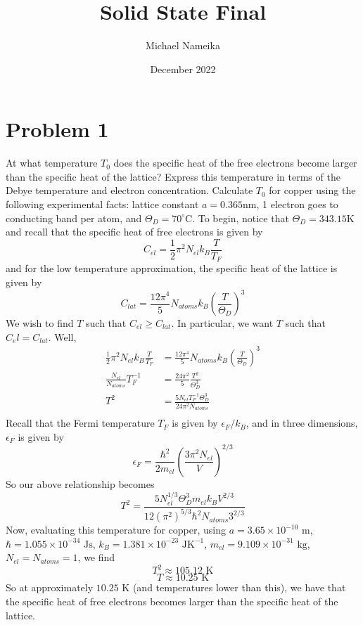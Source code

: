 \documentclass{article}
\title{Solid State Final}
\author{Michael Nameika}
\date{December 2022}
\begin{document}
\maketitle

\section*{Problem 1}
At what temperature $T_0$ does the specific heat of the free electrons become larger than the specific heat of the lattice? Express this temperature in terms of the Debye temperature and electron concentration. Calculate $T_0$ for copper using the following experimental facts: lattice constant $a = 0.365\text{nm}$, 1 electron goes to conducting band per atom, and $\Theta_D = 70^{\circ} \text{C}$.
\newline\newline
To begin, notice that $\Theta_D = 343.15 \text{K}$ and recall that the specific heat of free electrons is given by
\[C_{el} = \frac{1}{2}\pi^2N_{el}k_B\frac{T}{T_F}\]
and for the low temperature approximation, the specific heat of the lattice is given by
\[C_{lat} = \frac{12\pi^4}{5}N_{atoms}k_B\left(\frac{T}{\Theta_D}\right)^3\]
We wish to find $T$ such that $C_{el} \geq C_{lat}$. In particular, we want $T$ such that $C_el = C_{lat}$. Well,
\begin{align*}
    \frac{1}{2}\pi^2N_{el}k_B\frac{T}{T_F} &= \frac{12\pi^4}{5}N_{atoms}k_B\left(\frac{T}{\Theta_D}\right)^3 \\
    \frac{N_{el}}{N_{atoms}}T_F^{-1} &= \frac{24\pi^2}{5}\frac{T^2}{\Theta_D^3} \\
    T^2 &= \frac{5N_{el}T_F^{-1}\Theta_D^3}{24\pi^2N_{atoms}} \\
\end{align*}
Recall that the Fermi temperature $T_F$ is given by $\epsilon_F/k_B$, and in three dimensions, $\epsilon_F$ is given by
\[\epsilon_F = \frac{\hbar^2}{2m_{el}}\left(\frac{3\pi^2N_{el}}{V}\right)^{2/3}\]
So our above relationship becomes
\[T^2 = \frac{5N_{el}^{1/3}\Theta_D^3m_{el}k_BV^{2/3}}{12(\pi^2)^{5/3}\hbar^2N_{atoms}3^{2/3}}\]
Now, evaluating this temperature for copper, using $a = 3.65 \times 10^{-10} \text{ m}$, $\hbar = 1.055 \times 10^{-34} \text{ Js}$, $k_B = 1.381\times 10^{-23} \text{ JK}^{-1}$, $m_{el} = 9.109\times 10^{-31} \text{ kg}$, $N_{el} = N_{atoms} = 1$, we find 
\[T^2 \approx 105.12 \text{ K}\]
\[T \approx 10.25 \text{ K}\]
So at approximately $10.25 \text{ K}$ (and temperatures lower than this), we have that the specific heat of free electrons becomes larger than the specific heat of the lattice.
\end{document}
